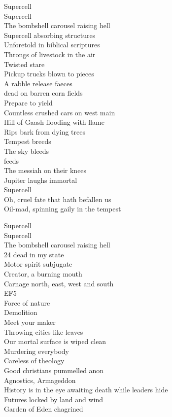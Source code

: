 Supercell \\
Supercell \\
The bombshell carousel raising hell \\

Supercell absorbing structures \\
Unforetold in biblical scriptures \\
Throngs of livestock in the air \\
Twisted stare \\
Pickup trucks blown to pieces \\
A rabble release faeces \\
 dead on barren corn fields \\
Prepare to yield \\
Countless crushed cars on west main \\
Hill of Gaash flooding with flame \\
Rips bark from dying trees \\
Tempest breeds \\
The sky bleeds \\
 feeds \\
The messiah on their knees \\
Jupiter laughs immortal \\
Supercell \\

Oh, cruel fate that hath befallen us \\
Oil-mad, spinning gaily in the tempest\

Supercell \\
Supercell \\
The bombshell carousel raising hell \\

24 dead in my state \\
Motor spirit subjugate \\
Creator, a burning mouth \\
Carnage north, east, west and south \\
EF5 \\
Force of nature \\
Demolition \\
Meet your maker \\
Throwing cities like leaves \\
Our mortal surface is wiped clean \\

Murdering everybody \\
Careless of theology \\
Good christians pummelled anon \\
Agnostics, Armageddon \\
History is in the eye awaiting death while leaders hide \\
Futures locked by land and wind \\
Garden of Eden chagrined \\

